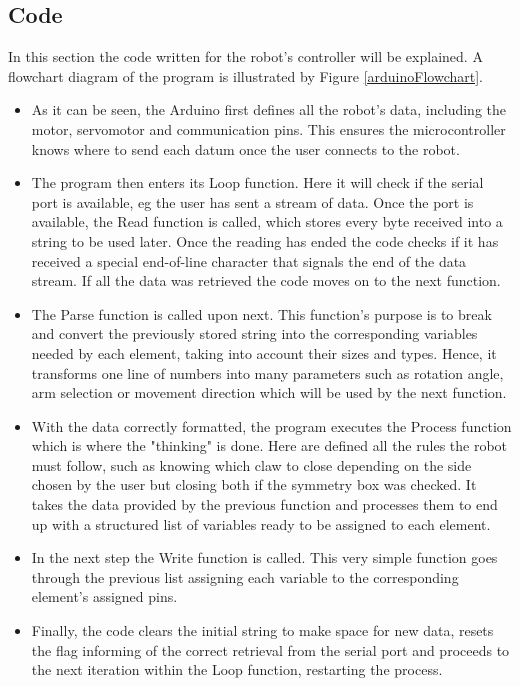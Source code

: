 \subsection{Code}

In this section the code written for the robot's controller will be explained. A flowchart diagram of the program is illustrated by Figure \ref{arduinoFlowchart}.\\

	\begin{itemize}
        
	    \item As it can be seen, the Arduino first defines all the robot's data, including the motor, servomotor and communication pins. This ensures the microcontroller knows where to send each datum once the user connects to the robot.\\

		\item The program then enters its Loop function. Here it will check if the serial port is available, eg the user has sent a stream of data. Once the port is available, the Read function is called, which stores every byte received into a string to be used later. Once the reading has ended the code checks if it has received a special end-of-line character that signals the end of the data stream. If all the data was retrieved the code moves on to the next function.\\

		\item The Parse function is called upon next. This function's purpose is to break and convert the previously stored string into the corresponding variables needed by each element, taking into account their sizes and types. Hence, it transforms one line of numbers into many parameters such as rotation angle, arm selection or movement direction which will be used by the next function.\\

		\item With the data correctly formatted, the program executes the Process function which is where the "thinking" is done. Here are defined all the rules the robot must follow, such as knowing which claw to close depending on the side chosen by the user but closing both if the symmetry box was checked. It takes the data provided by the previous function and processes them to end up with a structured list of variables ready to be assigned to each element.\\

		\item In the next step the Write function is called. This very simple function goes through the previous list assigning each variable to the corresponding element's assigned pins.\\

		\item Finally, the code clears the initial string to make space for new data, resets the flag informing of the correct retrieval from the serial port and proceeds to the next iteration within the Loop function, restarting the process.\\

	\end{itemize}

